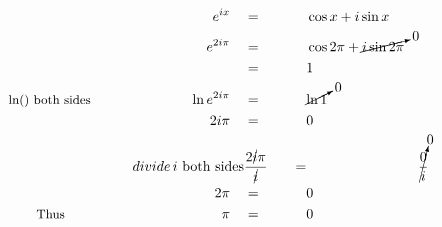 \begin{alignat*}{5}
&\,&e^{ix}\quad&=\quad&&\cos{x}+i\sin{x}\\
&\,&e^{2i\pi}\quad&=&&\cos{2\pi}+\cancelto{0}{i\sin{2\pi}}\\
&\,&\,&=&&1\\
&\small\text{ln() both sides}\normalsize\qquad&\ln{e^{2i\pi}}\quad&=&&\cancelto{0}{\ln{1}}\\
&\,&2i\pi\quad&=&&0\\
&\small&divide\,i\text{ both sides}&\frac{2\cancel{i}\pi}{\cancel{i}}\quad&=&&\cancelto{0}{\frac{0}{i}}\\
&\,&2\pi\quad&=&&0\\
&\qquad\small\text{Thus}&\pi\quad&=&&0
\end{alignat*}
